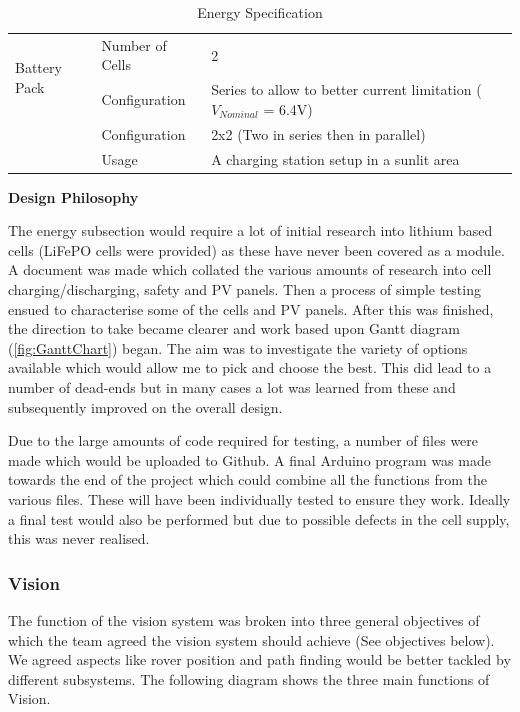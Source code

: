 \documentclass[10pt,twoside]{article}
\begin{document}
\begin{table}[htp]
\begin{tabular}{@{}cll@{}}
\multicolumn{1}{l}{\multirow{2}{*}{Battery Pack}} & Number of Cells   &  \parbox{0.61\linewidth}{2}           \\
                              & Configuration     & \parbox{0.61\linewidth}{Series to allow to better current limitation ($V_{Nominal}$ = 6.4V)}            \\ \midrule
{}                     & Configuration     &  \parbox{0.61\linewidth}{2x2 (Two in series then in parallel)}           \\ 
                                                  & Usage &
                                                  \parbox{0.61\linewidth}{A charging station setup in a sunlit area} \\ \bottomrule
\end{tabular}
\caption{\label{tab:EnergySpec} Energy Specification}
\end{table}

\textbf{Design Philosophy}

The energy subsection would require a lot of initial research into lithium based cells (LiFePO cells were provided) as these have never been covered as a module. A document was made which collated the various amounts of research into cell charging/discharging, safety and PV panels. Then a process of simple testing ensued to characterise some of the cells and PV panels. After this was finished, the direction to take became clearer and work based upon Gantt diagram (\ref{fig:GanttChart}) began. The aim was to investigate the variety of options available which would allow me to pick and choose the best. This did lead to a number of dead-ends but in many cases a lot was learned from these and subsequently improved on the overall design.

Due to the large amounts of code required for testing, a number of files were made which would be uploaded to Github. A final Arduino program was made towards the end of the project which could combine all the functions from the various files. These will have been individually tested to ensure they work. Ideally a final test would also be performed but due to possible defects in the cell supply, this was never realised.

\newpage


\subsubsection{Vision}
The function of the vision system was broken into three general objectives of which the team agreed the vision system should achieve (See objectives below). We agreed aspects like rover position and path finding would be better tackled by different subsystems. The following diagram shows the three main functions of Vision.
\end{document}
